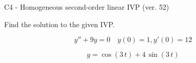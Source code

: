 \begin{exercise}
  \begin{exerciseTitle}C4 - Homogeneous second-order linear IVP (ver. 52)\end{exerciseTitle}
  \begin{exerciseStatement}
    
Find the solution to the given IVP.

    
\[y''+9y = 0 \hspace{1em} y(0) = 1 , y'(0) = 12\]

  \end{exerciseStatement}
  \begin{exerciseAnswer}
    
\[y= \cos\left(3 \, t\right) + 4 \, \sin\left(3 \, t\right)\]

  \end{exerciseAnswer}
\end{exercise}